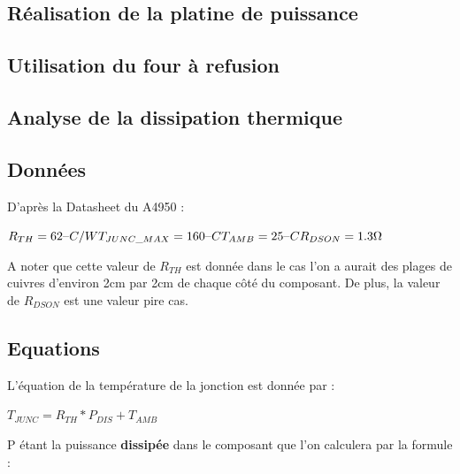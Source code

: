 \documentclass[11pt, french]{article} %
\begin{document}
\subsection{Réalisation de la platine de puissance}

\subsection{Utilisation du four à refusion}

\subsection{Analyse de la dissipation thermique}



\subsection{Données}

\noindent
D'après la Datasheet du A4950 :

\vspace{0.5cm}

\noindent
$ 
R_{TH} = 62 \char123C/W  \\
T_{JUNC\_MAX} = 160 \char123C  \\
T_{AMB} = 25\char123C  \\
R_{DSON} = 1.3 \Omega  \\
$



\noindent
A noter que cette valeur de $R_{TH}$ est donnée dans le cas l'on a aurait des plages de cuivres d'environ 2cm par 2cm de chaque côté du composant. De plus, la valeur de $R_{DSON}$ est une valeur pire cas.

\subsection{Equations}

\noindent
L'équation de la température de la jonction est donnée par :

\vspace{0.5cm}

\noindent
$
T_{JUNC} = R_{TH} * P_{DIS} + T_{AMB}
$

\vspace{0.5cm}

\noindent
P étant la puissance \textbf{dissipée} dans le composant que l'on calculera par la formule :

\vspace{0.5cm}
\end{document}
